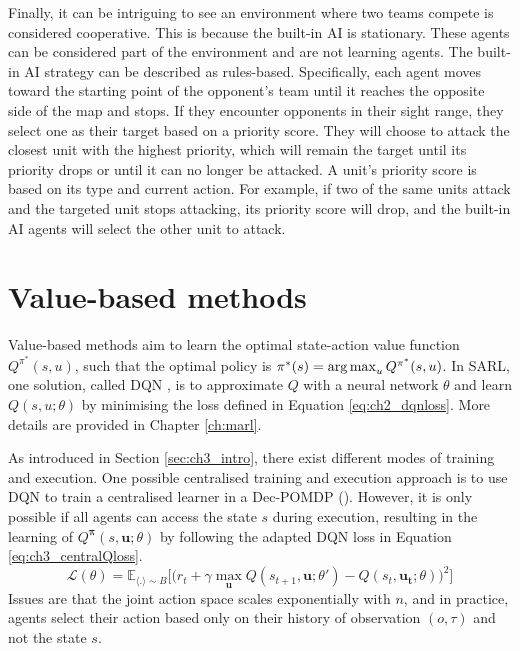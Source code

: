 Finally, it can be intriguing to see an environment where two teams compete is considered cooperative.
This is because the built-in AI is stationary. 
These agents can be considered part of the environment and are not learning agents.
The built-in AI strategy can be described as rules-based.
Specifically, each agent moves toward the starting point of the opponent's team until it reaches the opposite side of the map and stops.
If they encounter opponents in their sight range, they select one as their target based on a priority score.
They will choose to attack the closest unit with the highest priority, which will remain the target until its priority drops or until it can no longer be attacked.
A unit's priority score is based on its type and current action.
For example, if two of the same units attack and the targeted unit stops attacking, its priority score will drop, and the built-in AI agents will select the other unit to attack.

\section{Value-based methods}
\label{sec:ch3_value}

Value-based methods aim to learn the optimal state-action value function $Q^{\pi^*}(s, u)$, such that the optimal policy is $\pi^*(s)=\operatorname*{arg\,max}_{u} Q^{\pi^*}(s, u)$.
In SARL, one solution, called DQN \citep{Mnih2015}, is to approximate $Q$ with a neural network $\theta$ and learn $Q(s, u;\theta)$
by minimising the loss defined in Equation \ref{eq:ch2_dqnloss}.
More details are provided in Chapter \ref{ch:marl}.

As introduced in Section \ref{sec:ch3_intro}, there exist different modes of training and execution.
One possible centralised training and execution approach is to use DQN to train a centralised learner in a Dec-POMDP ().
However, it is only possible if all agents can access the state $s$ during execution, resulting in the learning of $Q^{\boldsymbol{\pi}}(s,\mathbf{u}; \theta)$ by following the adapted DQN loss in Equation \ref{eq:ch3_centralQloss}.
\begin{equation}
\label{eq:ch3_centralQloss}
    \mathcal{L}(\theta) = \mathbb{E}_{\langle . \rangle\sim B} \big[\big(r_{t} + \gamma \max_{\mathbf{u}} Q(s_{t+1}, \mathbf{u}; \theta')- Q(s_{t}, \mathbf{\mathbf{u_t}}; \theta)\big)^{2}\big]
\end{equation}
Issues are that the joint action space scales exponentially with $n$, and in practice, agents select their action based only on their history of observation $(o, \tau)$ and not the state $s$.

